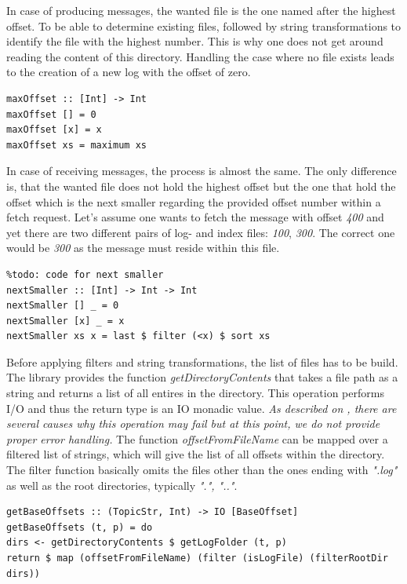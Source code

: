 In case of producing messages, the wanted file is the one named after the
highest offset. To be able to determine existing files, followed by string
transformations to identify the file with the highest number. This is why one
does not get around reading the content of this directory. Handling the case
where no file exists leads to the creation of a new log with the offset of zero.

\begin{lstlisting}
maxOffset :: [Int] -> Int
maxOffset [] = 0
maxOffset [x] = x
maxOffset xs = maximum xs
\end{lstlisting}

In case of receiving messages, the process is almost the same. The only
difference is, that the wanted file does not hold the highest offset but the one
that hold the offset which is the next smaller regarding the provided offset
number within a fetch request. Let's assume one wants to fetch the message with
offset \textit{400} and yet there are two different pairs of log- and index
files: \textit{100}, \textit{300}. The correct one would be \textit{300} as the
message must reside within this file.

\begin{lstlisting}
%todo: code for next smaller
nextSmaller :: [Int] -> Int -> Int
nextSmaller [] _ = 0
nextSmaller [x] _ = x
nextSmaller xs x = last $ filter (<x) $ sort xs
\end{lstlisting}

Before applying filters and string transformations, the list of files has to be
build. The library
provides the function \textit{getDirectoryContents} that takes a file path as a
string and returns a list of all entires in the directory. This operation
performs I/O and thus the return type is an IO monadic value. \textit{As
described on
,
there are several causes why this operation may fail but at this point, we do
not provide proper error handling.}
The function \textit{offsetFromFileName} can be mapped over a filtered list of
strings, which will give the list of all offsets within the directory. The
filter function basically omits the files other than the ones ending with
\textit{".log"} as well as the root directories, typically \textit{".", ".."}.

\begin{lstlisting}
getBaseOffsets :: (TopicStr, Int) -> IO [BaseOffset]
getBaseOffsets (t, p) = do
dirs <- getDirectoryContents $ getLogFolder (t, p)
return $ map (offsetFromFileName) (filter (isLogFile) (filterRootDir dirs))
\end{lstlisting}

